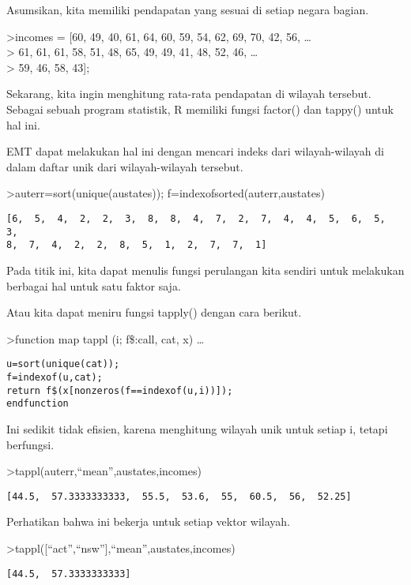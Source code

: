 \documentclass[
]{book}
\begin{document}
Asumsikan, kita memiliki pendapatan yang sesuai di setiap negara bagian.

\textgreater incomes = {[}60, 49, 40, 61, 64, 60, 59, 54, 62, 69, 70, 42, 56, \ldots{}\\
\textgreater{} 61, 61, 61, 58, 51, 48, 65, 49, 49, 41, 48, 52, 46, \ldots{}\\
\textgreater{} 59, 46, 58, 43{]};

Sekarang, kita ingin menghitung rata-rata pendapatan di wilayah tersebut. Sebagai sebuah program statistik, R memiliki fungsi factor() dan tappy() untuk hal ini.

EMT dapat melakukan hal ini dengan mencari indeks dari wilayah-wilayah di dalam daftar unik dari wilayah-wilayah tersebut.

\textgreater auterr=sort(unique(austates)); f=indexofsorted(auterr,austates)

\begin{verbatim}
[6,  5,  4,  2,  2,  3,  8,  8,  4,  7,  2,  7,  4,  4,  5,  6,  5,  3,
8,  7,  4,  2,  2,  8,  5,  1,  2,  7,  7,  1]
\end{verbatim}

Pada titik ini, kita dapat menulis fungsi perulangan kita sendiri untuk melakukan berbagai hal untuk satu faktor saja.

Atau kita dapat meniru fungsi tapply() dengan cara berikut.

\textgreater function map tappl (i; f\$:call, cat, x) \ldots{}

\begin{verbatim}
u=sort(unique(cat));
f=indexof(u,cat);
return f$(x[nonzeros(f==indexof(u,i))]);
endfunction
\end{verbatim}

Ini sedikit tidak efisien, karena menghitung wilayah unik untuk setiap i, tetapi berfungsi.

\textgreater tappl(auterr,``mean'',austates,incomes)

\begin{verbatim}
[44.5,  57.3333333333,  55.5,  53.6,  55,  60.5,  56,  52.25]
\end{verbatim}

Perhatikan bahwa ini bekerja untuk setiap vektor wilayah.

\textgreater tappl({[}``act'',``nsw''{]},``mean'',austates,incomes)

\begin{verbatim}
[44.5,  57.3333333333]
\end{verbatim}
\end{document}
